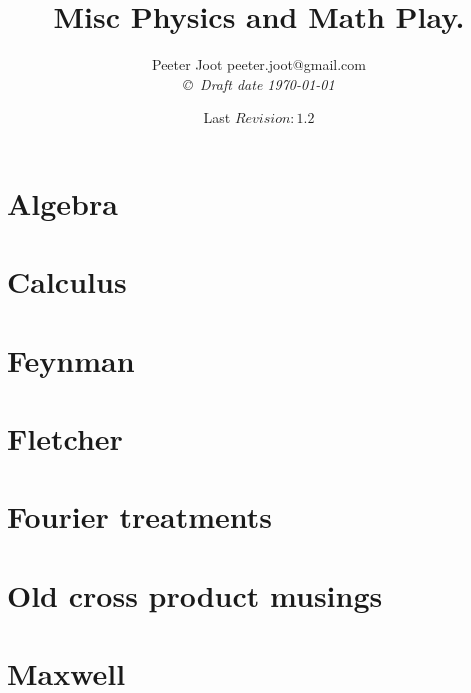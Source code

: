 \documentclass[12pt,leqno]{book}
\date{ Last $Revision: 1.2 $ }
\begin{document}

\title{Misc Physics and Math Play.}
\author{Peeter Joot  \quad peeter.joot@gmail.com \\
{\small\em \copyright \  Draft date \today }}

\maketitle

\clearpage{}
\tableofcontents

\clearpage{}

\pagestyle{plain}




\part{Algebra}





\part{Calculus}






\part{Feynman}


\part{Fletcher}


\part{Fourier treatments}


\part{Old cross product musings}



\part{Maxwell}


\end{document}
